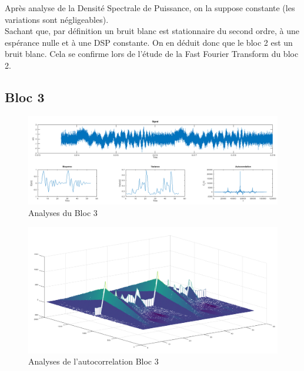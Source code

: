 \documentclass[french, a4paper, 12pt, openany]{book}
\begin{document}
	Après analyse de la Densité Spectrale de Puissance, on la suppose constante (les variations sont négligeables). \\
	Sachant que, par définition un bruit blanc est stationnaire du second ordre, à une espérance nulle et à une DSP constante. On en déduit donc que le bloc 2 est un bruit blanc. Cela se confirme lors de l'étude de la Fast Fourier Transform du bloc 2.

  \subsection{Bloc 3}

	\begin{figure}[ht]
		\begin{center}
		\includegraphics[scale=0.25]{images/SignalBloc3.png}
		\end{center}
		\caption{Analyses du Bloc 3}
		\label{Analyses du Bloc 3}
	\end{figure}

	\begin{figure}[ht]
		\begin{center}
		\includegraphics[scale=0.25]{images/AutoCorrBloc3.png}
		\end{center}
		\caption{Analyses de l'autocorrelation Bloc 3}
		\label{Analyses de l'autocorrelation Bloc 3}
	\end{figure}
\end{document}
